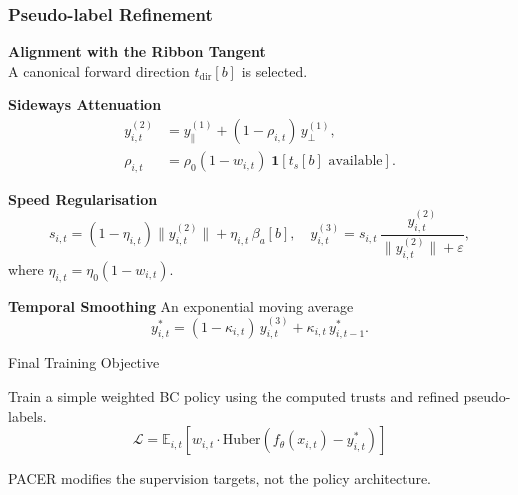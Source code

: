 \documentclass{beamer}
\begin{document}
\begin{frame}
    \frametitle{\textbf{Pseudo-label Refinement}}

    \textbf{Alignment with the Ribbon Tangent}\\
    A canonical forward direction $t_{\mathrm{dir}}[b]$ is selected.

    \textbf{Sideways Attenuation}
    \begin{equation}
        \begin{aligned}
            y^{(2)}_{i,t} &= y^{(1)}_\parallel + (1 - \rho_{i,t})\, y^{(1)}_\perp,\\
            \rho_{i,t} &= \rho_0(1-w_{i,t})\;\mathbf{1}[t_s[b]\text{ available}].
        \end{aligned}
    \end{equation}

    \textbf{Speed Regularisation}
    \begin{equation}
        s_{i,t} = (1-\eta_{i,t})\|y^{(2)}_{i,t}\| + \eta_{i,t}\,\beta_a[b],
        \quad y^{(3)}_{i,t} = s_{i,t}\,\frac{y^{(2)}_{i,t}}{\|y^{(2)}_{i,t}\|+\varepsilon},
    \end{equation}
    where $\eta_{i,t} = \eta_0(1-w_{i,t})$.

    \textbf{Temporal Smoothing}
    An exponential moving average
    \begin{equation}
        y^*_{i,t} = (1-\kappa_{i,t})\, y^{(3)}_{i,t} + \kappa_{i,t}\, y^*_{i,t-1}.
    \end{equation}

\end{frame}


\begin{frame}{Final Training Objective}

    Train a simple weighted BC policy using the computed trusts and refined pseudo-labels.
    \[
        \mathcal{L}
        =
        \mathbb{E}_{i,t}
        \left[
            w_{i,t}
            \cdot
            \mathrm{Huber}
            (
                f_\theta(x_{i,t})
                -
                y^*_{i,t}
            )
        \right]
    \]

    \vspace{1.5em}

    PACER modifies the supervision targets, not the policy architecture.

\end{frame}
\end{document}
